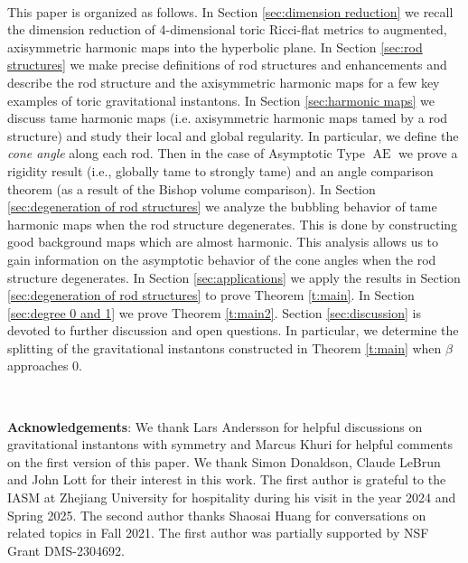 \documentclass[a4paper,11pt]{amsart}
\theoremstyle{definition}
\numberwithin{equation}{section}
\DeclareMathOperator{\Ae}{AE}
\begin{document}
\


This paper is organized as follows. In Section \ref{sec:dimension reduction} we recall the dimension reduction of 4-dimensional toric Ricci-flat metrics to augmented, axisymmetric harmonic maps  into the hyperbolic plane. In Section \ref{sec:rod structures} we make precise definitions of rod structures and enhancements and describe the rod structure and the axisymmetric harmonic maps for a few key examples of toric gravitational instantons. In Section \ref{sec:harmonic maps} we discuss tame harmonic maps (i.e. axisymmetric harmonic maps tamed by a rod structure) and study their local and global regularity. In particular, we define the \emph{cone angle} along each rod. Then in the case of  Asymptotic Type  $\Ae$ we prove a rigidity result (i.e., globally tame to strongly tame) and an angle comparison theorem (as a result of the Bishop volume comparison). In Section \ref{sec:degeneration of rod structures} we analyze the bubbling behavior of tame harmonic maps when the rod structure degenerates. This is done by constructing good background maps which are almost harmonic. This analysis allows us to gain information on the asymptotic behavior of the cone angles when the rod structure degenerates. In Section \ref{sec:applications} we apply the results in Section \ref{sec:degeneration of rod structures} to prove Theorem \ref{t:main}. In Section \ref{sec:degree 0 and 1} we prove Theorem \ref{t:main2}. Section \ref{sec:discussion} is devoted to further discussion and open questions. In particular, we determine the splitting of the gravitational instantons constructed in Theorem \ref{t:main} when $\beta$ approaches $0$. 





\

 {\bf Acknowledgements}: We thank Lars Andersson for helpful discussions on gravitational instantons with symmetry and Marcus Khuri for helpful comments on the first version of this paper. We thank Simon Donaldson, Claude LeBrun and John Lott for their interest in this work.  The first author is grateful to the IASM at Zhejiang University for hospitality during his visit in the year 2024 and Spring 2025. The second author thanks Shaosai Huang for conversations on related topics in Fall 2021. The first author was partially supported by NSF Grant DMS-2304692.

\
\end{document}

